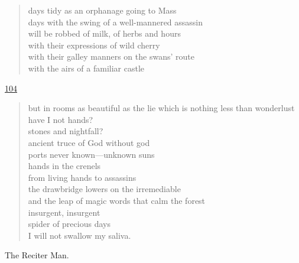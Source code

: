 \documentclass[letterpaper,article,12pt,oneside,notitlepage]{memoir}
\begin{document}
\begin{verse}
days tidy as an orphanage going to Mass \\
days with the swing of a well-mannered assassin \\
will be robbed of milk, of herbs and hours \\
with their expressions of wild cherry \\
with their galley manners on the swans' route \\
with the airs of a familiar castle \\
\end{verse}

\clearpage

\href{http://cesaire.elotroalex.com/chiens/chiens/p104.html}{104}

\begin{verse}
but in rooms as beautiful as the lie which is nothing less than wonderlust \\
have I not hands? \\
stones and nightfall? \\
ancient truce of God without god \\
ports never known---unknown suns \\
hands in the crenels \\
from living hands to assassins \\
the drawbridge lowers on the irremediable \\
and the leap of magic words that calm the forest \\
insurgent, insurgent \\
spider of precious days \\
I will not swallow my saliva. \\
\end{verse}

\begin{center}The Reciter Man.\end{center}
\end{document}
